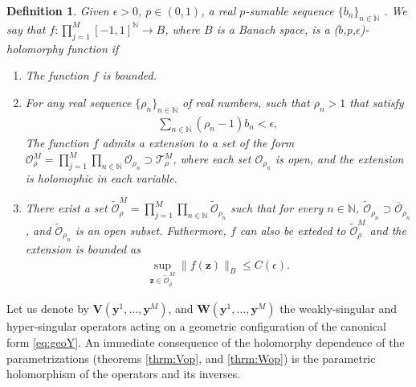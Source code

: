 \documentclass{article}
\newtheorem{definition}[theorem]{Definition}
\newcommand{\IN}{{\mathbb N}}
\newcommand{\by}{\bm{y}}
\begin{document}
\begin{definition}
Given $\epsilon >0$, $p \in (0,1)$, a real $p$-sumable sequence $\{b_n\}_{n \in \IN}$ . We say that $f:\prod_{j=1}^M[-1,1]^\IN\rightarrow B$, where $B$ is a Banach space, is a ($b$,p,$\epsilon$)-holomorphy function if
\begin{enumerate}
\item The function $f$ is bounded.
\item 
For any real sequence $\{\rho_n\}_{n \in \IN}$ of real numbers, such that $\rho_n >1$ that satisfy 
\begin{align*}
\sum_{n \in \IN} (\rho_n -1) b_n < \epsilon, 
\end{align*}
The function $f$ admits a extension to a set of the form $\mathcal{O}^M_\rho = \prod_{j=1}^M \prod_{n \in \IN} \mathcal{O}_{\rho_n} \supset \mathcal{T}^M_\rho$, where each set $\mathcal{O}_{\rho_n}$ is open, and the extension is holomophic in each variable. 
\item 
There exist a set $\widetilde{\mathcal{O}}_\rho^M =  \prod_{j=1}^M \prod_{n \in \IN} \widetilde{\mathcal{O}}_{\rho_n}$ such that for every $n \in \IN$, $\widetilde{\mathcal{O}}_{\rho_n} \supset \overline{\mathcal{O}}_{\rho_n}$, and $\widetilde{\mathcal{O}}_{\rho_n}$ is an open subset. Futhermore, $f$ can also be exteded to $\widetilde{\mathcal{O}}_\rho^M$ and the extension is bounded as 
\begin{align*}
\sup_{\mathbf{z} \in \widetilde{\mathcal{O}}_\rho^M } \| f(\mathbf{z})\|_B \leq C(\epsilon).
\end{align*}
\end{enumerate}
\end{definition}

Let us denote by $\mathbf{V}(\by^1,\hdots,\by^M)$, and $\mathbf{W}(\by^1,\hdots,\by^M)$ the weakly-singular and hyper-singular operators acting on a geometric configuration of the canonical form \eqref{eq:geoY}. An immediate consequence of the holomorphy dependence of the parametrizations (theorems \ref{thrm:Vop}, and \ref{thrm:Wop}) is the parametric holomorphism of the operators and its inverses. 
\end{document}
